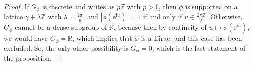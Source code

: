 \documentclass[12pt,a4paper,reqno]{amsart}
\theoremstyle{remark}
\newcommand{\Z}{\mathbb{Z}}
\newcommand{\R}{\mathbb{R}}
\newcommand{\E}{\mathrm{e}}
\newcommand{\I}{\mathrm{i}}
\newcommand{\supp}{\mathrm{supp}}
\begin{document}
\begin{proof}
If $G_\phi$ is discrete and writes as $p\Z$ with $p>0$, then $\phi$ is supported on a lattice $\gamma + \lambda \Z$ with $\lambda = \frac{2\pi}{p}$, and $|\phi(\E^{\I u})|=1$ if and only if $u \in \frac{2\pi\Z}{\lambda}$. Otherwise, $G_\phi$ cannot be a dense subgroup of $\R$, because then by continuity of $u \mapsto \phi(\E^{\I u})$, we would have $G_\phi=\R$, which implies that $\phi$ is a Dirac, and this case has been excluded. So, the only other possibility is $G_\phi=0$, which is the last statement of the proposition. \end{proof}


\end{document}
